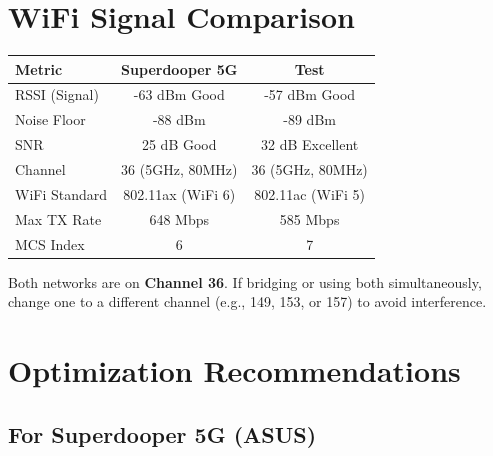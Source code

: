 \documentclass[11pt,letterpaper]{article}
\begin{document}
\section{WiFi Signal Comparison}

\begin{center}
\begin{tabular}{lcc}
\toprule
\textbf{Metric} & \textbf{Superdooper 5G} & \textbf{Test} \\
\midrule
RSSI (Signal) & -63 dBm \textcolor{goodcolor}{Good} & -57 dBm \textcolor{goodcolor}{Good} \\
Noise Floor & -88 dBm & -89 dBm \\
SNR & 25 dB \textcolor{goodcolor}{Good} & 32 dB \textcolor{goodcolor}{Excellent} \\
Channel & 36 (5GHz, 80MHz) & 36 (5GHz, 80MHz) \\
WiFi Standard & 802.11ax (WiFi 6) & 802.11ac (WiFi 5) \\
Max TX Rate & 648 Mbps & 585 Mbps \\
MCS Index & 6 & 7 \\
\bottomrule
\end{tabular}
\end{center}

\begin{tcolorbox}[colback=yellow!10,colframe=yellow!50!black,title=Channel Conflict Warning]
Both networks are on \textbf{Channel 36}. If bridging or using both simultaneously, change one to a different channel (e.g., 149, 153, or 157) to avoid interference.
\end{tcolorbox}

\section{Optimization Recommendations}

\subsection{For Superdooper 5G (ASUS)}
\end{document}
